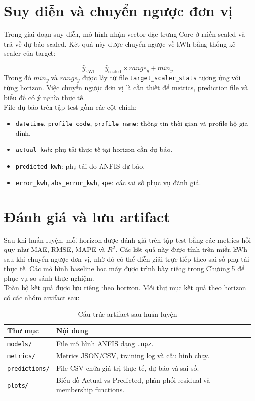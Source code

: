 \section{Suy diễn và chuyển ngược đơn vị}

Trong giai đoạn suy diễn, mô hình nhận vector đặc trưng Core ở miền scaled và trả về dự báo scaled. Kết quả này được chuyển ngược về kWh bằng thống kê scaler của target:

\begin{equation}
  \hat{y}_{\mathrm{kWh}} =
  \hat{y}_{\mathrm{scaled}} \times range_y + min_y
\end{equation}
Trong đó $min_y$ và $range_y$ được lấy từ file \texttt{target\_scaler\_stats} tương ứng với từng horizon. Việc chuyển ngược đơn vị là cần thiết để metrics, prediction file và biểu đồ có ý nghĩa thực tế.
\\
File dự báo trên tập test gồm các cột chính:

\begin{itemize}[leftmargin=1.2cm]
  \item \texttt{datetime}, \texttt{profile\_code}, \texttt{profile\_name}: thông tin thời gian và profile hộ gia đình.
  \item \texttt{actual\_kwh}: phụ tải thực tế tại horizon cần dự báo.
  \item \texttt{predicted\_kwh}: phụ tải do ANFIS dự báo.
  \item \texttt{error\_kwh}, \texttt{abs\_error\_kwh}, \texttt{ape}: các sai số phục vụ đánh giá.
\end{itemize}

\section{Đánh giá và lưu artifact}

Sau khi huấn luyện, mỗi horizon được đánh giá trên tập test bằng các metrics hồi quy như MAE, RMSE, MAPE và $R^2$. Các kết quả này được tính trên miền kWh sau khi chuyển ngược đơn vị, nhờ đó có thể diễn giải trực tiếp theo sai số phụ tải thực tế. Các mô hình baseline học máy được trình bày riêng trong Chương 5 để phục vụ so sánh thực nghiệm.
\\
Toàn bộ kết quả được lưu riêng theo horizon. Mỗi thư mục kết quả theo horizon có các nhóm artifact sau:

\begin{table}[H]
  \centering
  \begin{tabular}{p{4.4cm} p{8.8cm}}
    \toprule
    \textbf{Thư mục} & \textbf{Nội dung} \\
    \midrule
    \texttt{models/} & File mô hình ANFIS dạng \texttt{.npz}. \\
    \texttt{metrics/} & Metrics JSON/CSV, training log và cấu hình chạy. \\
    \texttt{predictions/} & File CSV chứa giá trị thực tế, dự báo và sai số. \\
    \texttt{plots/} & Biểu đồ Actual vs Predicted, phân phối residual và membership functions. \\
    \bottomrule
  \end{tabular}
  \caption{Cấu trúc artifact sau huấn luyện}
\end{table}

